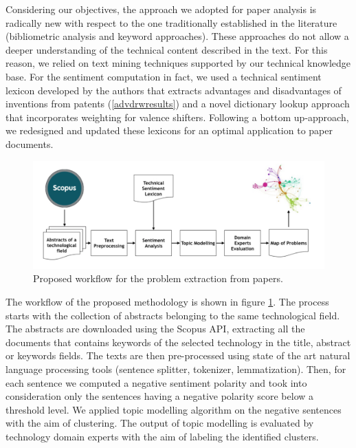 \documentclass[]{book}
\begin{document}
Considering our objectives, the approach we adopted for paper analysis
is radically new with respect to the one traditionally established in
the literature (bibliometric analysis and keyword approaches). These
approaches do not allow a deeper understanding of the technical content
described in the text. For this reason, we relied on text mining
techniques supported by our technical knowledge base. For the sentiment
computation in fact, we used a technical sentiment lexicon developed by
the authors that extracts advantages and disadvantages of inventions
from patents (\ref{advdrwresults}) and a novel dictionary lookup
approach that incorporates weighting for valence shifters. Following a
bottom up-approach, we redesigned and updated these lexicons for an
optimal application to paper documents.

\begin{figure}

{\centering \includegraphics[width=0.8\linewidth]{_bookdown_files/figures/bcworkflow} 

}

\caption{Proposed workflow for the problem extraction from papers. }\label{fig:bcworkflow}
\end{figure}

The workflow of the proposed methodology is shown in figure
\ref{fig:bcworkflow}. The process starts with the collection of
abstracts belonging to the same technological field. The abstracts are
downloaded using the Scopus API, extracting all the documents that
contains keywords of the selected technology in the title, abstract or
keywords fields. The texts are then pre-processed using state of the art
natural language processing tools (sentence splitter, tokenizer,
lemmatization). Then, for each sentence we computed a negative sentiment
polarity and took into consideration only the sentences having a
negative polarity score below a threshold level. We applied topic
modelling algorithm on the negative sentences with the aim of
clustering. The output of topic modelling is evaluated by technology
domain experts with the aim of labeling the identified clusters.
\end{document}
